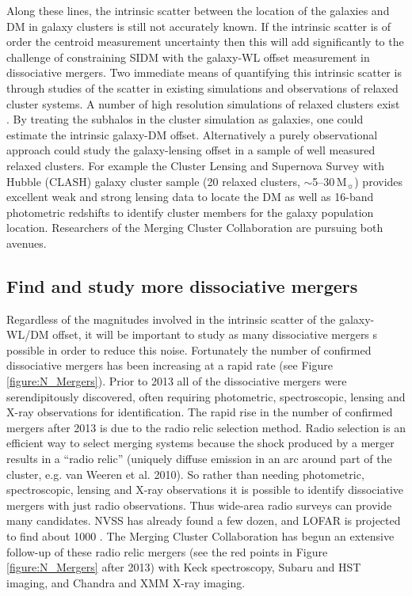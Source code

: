 {Along these lines, the intrinsic scatter between the location of the galaxies and DM in galaxy clusters is still not accurately known.
If the intrinsic scatter is of order the centroid measurement uncertainty then this will add significantly to the challenge of constraining SIDM with the galaxy-WL offset measurement in dissociative mergers.
Two immediate means of quantifying this intrinsic scatter is through studies of the scatter in existing simulations and observations of relaxed cluster systems.
A number of high resolution simulations of relaxed clusters exist \citep[e.g.][, which include both CDM and SIDM simulation]{Peter:2012vi, Rocha:2012tr}.
By treating the subhalos in the cluster simulation as galaxies, one could estimate the intrinsic galaxy-DM offset.
Alternatively a purely observational approach could study the galaxy-lensing offset in a sample of well measured relaxed clusters.
For example the Cluster Lensing and Supernova Survey with Hubble (CLASH) galaxy cluster sample (20 relaxed clusters, $\sim$5--30\,M$_\sun$) provides excellent weak and strong lensing data to locate the DM as well as 16-band photometric redshifts to identify cluster members for the galaxy population location.
Researchers of the Merging Cluster Collaboration are pursuing both avenues.

\subsection{Find and study more dissociative mergers}

Regardless of the magnitudes involved in the intrinsic scatter of the galaxy-WL/DM offset, it will be important to study as many dissociative mergers s possible in order to reduce this noise.
Fortunately the number of confirmed dissociative mergers has been increasing at a rapid rate (see Figure \ref{figure:N_Mergers}).
Prior to 2013 all of the dissociative mergers were serendipitously discovered, often requiring photometric, spectroscopic, lensing and X-ray observations for identification.
The rapid rise in the number of confirmed mergers after 2013 is due to the radio relic selection method.
Radio selection is an efficient way to select merging systems because the shock produced by a merger results in a ``radio relic'' (uniquely diffuse emission in an arc around part of the cluster, e.g. van Weeren et al. 2010).
So rather than needing photometric, spectroscopic, lensing and X-ray observations it is possible to identify dissociative mergers with just radio observations.
Thus wide-area radio surveys can provide many candidates. 
NVSS has already found a few dozen, and LOFAR is projected to find about 1000 \citep{Nuza:2012fu}.
The Merging Cluster Collaboration has begun an extensive follow-up of these radio relic mergers (see the red points in Figure \ref{figure:N_Mergers} after 2013) with Keck spectroscopy, Subaru and HST imaging, and Chandra and XMM X-ray imaging.

}
